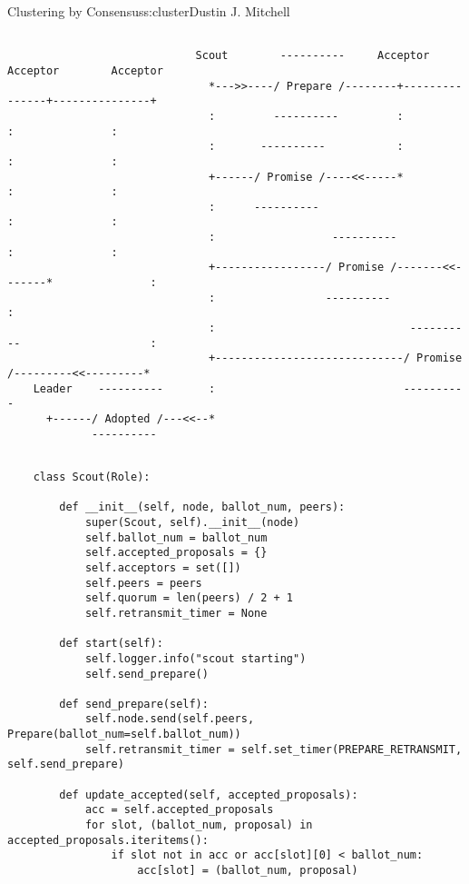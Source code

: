 \begin{aosachapter}{Clustering by Consensus}{s:cluster}{Dustin J. Mitchell}
\begin{verbatim}

                             Scout        ----------     Acceptor        Acceptor        Acceptor
                               *--->>----/ Prepare /--------+---------------+---------------+
                               :         ----------         :               :               :
                               :       ----------           :               :               :
                               +------/ Promise /----<<-----*               :               :
                               :      ----------                            :               :
                               :                  ----------                :               :
                               +-----------------/ Promise /-------<<-------*               :
                               :                 ----------                                 :
                               :                              ----------                    :
                               +-----------------------------/ Promise /---------<<---------*
    Leader    ----------       :                             ---------- 
      +------/ Adopted /---<<--*
             ----------   
\end{verbatim}

\begin{verbatim}

    class Scout(Role):
    
        def __init__(self, node, ballot_num, peers):
            super(Scout, self).__init__(node)
            self.ballot_num = ballot_num
            self.accepted_proposals = {}
            self.acceptors = set([])
            self.peers = peers
            self.quorum = len(peers) / 2 + 1
            self.retransmit_timer = None
    
        def start(self):
            self.logger.info("scout starting")
            self.send_prepare()
    
        def send_prepare(self):
            self.node.send(self.peers, Prepare(ballot_num=self.ballot_num))
            self.retransmit_timer = self.set_timer(PREPARE_RETRANSMIT, self.send_prepare)
    
        def update_accepted(self, accepted_proposals):
            acc = self.accepted_proposals
            for slot, (ballot_num, proposal) in accepted_proposals.iteritems():
                if slot not in acc or acc[slot][0] < ballot_num:
                    acc[slot] = (ballot_num, proposal)
    

\end{verbatim}
\end{aosachapter}
